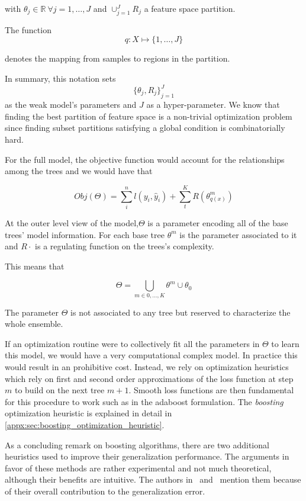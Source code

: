 with $\theta_j \in \mathbb{R} \ \forall j = 1,\ldots,J$ and $ \cup_{j=1}^J R_j$ a feature space partition.

The function
\begin{equation}
q : X \mapsto \{1,\ldots,J\}
\end{equation}

denotes the mapping from samples to regions in the partition.

In summary, this notation sets
$${\{\theta_j, R_j\}}_{j=1}^J$$
as the weak model's parameters and $J$ as a hyper-parameter.
We know that finding the best partition of feature space is a non-trivial optimization problem since finding subset partitions satisfying a global condition is combinatorially hard.

For the full model, the objective function would account for the relationships among the trees and we would have that

\begin{equation}\label{eq:boosting-objfunction}
Obj(\Theta) = \sum_i^n l(y_i,\hat{y}_i) + \sum_t^K R(\theta^m_{q(x)})
\end{equation}

At the outer level view of the model,$\Theta$ is a parameter encoding all of the base trees' model information.
For each base tree $\theta^m$ is the parameter associated to it and $R{\cdot}$ is a regulating function on the trees's complexity.

This means that

$$\Theta = \bigcup_{m \in {0,\ldots,K}} \theta^m \cup \theta_0$$

The parameter $\Theta$ is not associated to any tree but reserved to characterize the whole ensemble.

If an optimization routine were to collectively fit all the parameters in $\Theta$ to learn this model, we would have a very computational complex model.
In practice this would result in an prohibitive cost.
Instead, we rely on optimization heuristics which rely on first and second order approximations of the loss function at step $m$ to build on the next tree $m+1$.
Smooth loss functions are then fundamental for this procedure to work such as in the adaboost formulation.
The \textit{boosting} optimization heuristic is explained in detail in \cref{appx:sec:boosting_optimization_heuristic}.


As a concluding remark on boosting algorithms, there are two additional heuristics used to improve their generalization performance.
The arguments in favor of these methods are rather experimental and not much theoretical, although their benefits are intuitive.
The authors in~\cite{hastie-elemstatslearn} and~\cite{bishop-patternRecognition} mention them because of their overall contribution to the generalization error.

